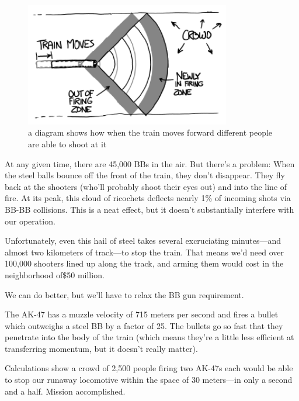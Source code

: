 \begin{figure}[!htbp]
\centering
\includegraphics[scale=0.5, max width=0.8\textwidth]{imgs/a/18/bb_moving.png}
\caption{a diagram shows how when the train moves forward different people are able to shoot at it}
\end{figure}

{At any given time, there are 45,000 BBs in the air. But there’s a problem: When the steel balls bounce off the front of the train, they don’t disappear. They fly back at the shooters (who’ll probably shoot their eyes out) and into the line of fire. At its peak, this cloud of ricochets deflects nearly 1\% of incoming shots via BB-BB collisions. This is a neat effect, but it doesn’t substantially interfere with our operation.}

{Unfortunately, even this hail of steel takes several excruciating minutes—and almost two kilometers of track—to stop the train. That means we’d need over 100,000 shooters lined up along the track, and arming them would cost in the neighborhood of\$50 million.}

{We can do better, but we’ll have to relax the BB gun requirement.}

{The AK-47 has a muzzle velocity of 715 meters per second and fires a bullet which outweighs a steel BB by a factor of 25. The bullets go so fast that they penetrate into the body of the train (which means they’re a little less efficient at transferring momentum, but it doesn’t really matter).}

{Calculations show a crowd of 2,500 people firing two AK-47s each would be able to stop our runaway locomotive within the space of 30 meters—in only a second and a half. Mission accomplished.}


